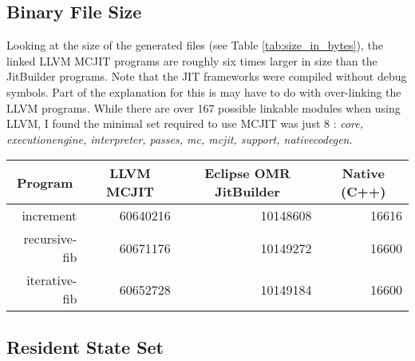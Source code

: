 \subsection{Binary File Size}
Looking at the size of the generated files (see Table \ref{tab:size_in_bytes}), the linked LLVM MCJIT programs are roughly six times larger in size than the JitBuilder programs.
Note that the JIT frameworks were compiled without debug symbols.
Part of the explanation for this is may have to do with over-linking the LLVM programs.
While there are over 167 possible linkable modules when using LLVM, I found the minimal set required to use MCJIT was just 8 : \textit{core, executionengine, interpreter, passes, mc, mcjit, support, nativecodegen}.

\begin{table*}[t]
  \begin{tabular}{|r|l|l|l|} 
  \hline
  \multicolumn{1}{|c|}{\textbf{Program}}
  & \multicolumn{1}{c|}{\textbf{LLVM MCJIT}}                      & \multicolumn{1}{c|}{\textbf{Eclipse OMR JitBuilder}}
  & \multicolumn{1}{c|}{\textbf{Native (C++)}}                    \\ \hline

  increment                               
  & \multicolumn{1}{r|}{\num{60640216}} %
  & \multicolumn{1}{r|}{\num{10148608}} %
  & \multicolumn{1}{r|}{\num{16616}}    %
  \\ \hline
  
  recursive-fib                           
  & \multicolumn{1}{r|}{\num{60671176}} %
  & \multicolumn{1}{r|}{\num{10149272}} %
  & \multicolumn{1}{r|}{\num{16600}}   %
  \\ \hline
  
  iterative-fib                           
  & \multicolumn{1}{r|}{\num{60652728}} %
  & \multicolumn{1}{r|}{\num{10149184}} %
  & \multicolumn{1}{r|}{\num{16600}}   %
  \\ \hline
  
\end{tabular}
  \caption{Total size in bytes of linked binary test programs.}
  \label{tab:size_in_bytes}
\end{table*}

\subsection{Resident State Set}


